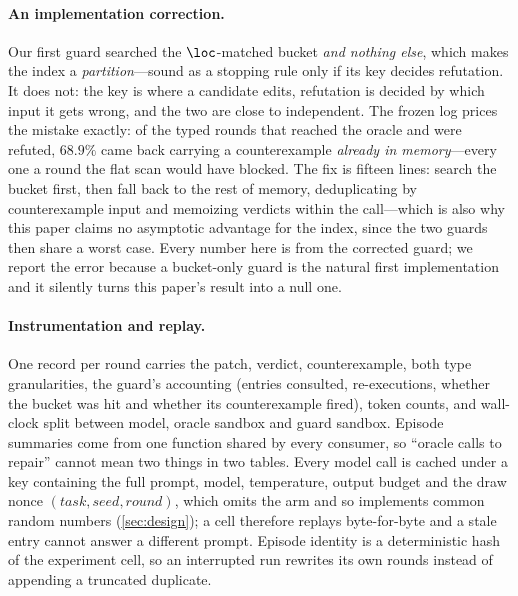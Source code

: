 \paragraph{An implementation correction.}
Our first guard searched the $\loc$-matched bucket \emph{and nothing else},
which makes the index a \emph{partition}---sound as a stopping rule only if its
key decides refutation. It does not: the key is where a candidate edits,
refutation is decided by which input it gets wrong, and the two are close to
independent. The frozen log prices the mistake exactly: of the typed rounds
that reached the oracle and were refuted, $68.9\%$ came back carrying a
counterexample \emph{already in memory}---every one a round the flat scan would
have blocked. The fix is fifteen lines: search the bucket first, then fall back
to the rest of memory, deduplicating by counterexample input and memoizing
verdicts within the call---which is also why this paper claims no asymptotic
advantage for the index, since the two guards then share a worst case. Every
number here is from the corrected guard; we report the error because a
bucket-only guard is the natural first implementation and it silently turns
this paper's result into a null one.

\paragraph{Instrumentation and replay.}
One record per round carries the patch, verdict, counterexample, both type
granularities, the guard's accounting (entries consulted, re-executions,
whether the bucket was hit and whether its counterexample fired), token counts,
and wall-clock split between model, oracle sandbox and guard sandbox. Episode
summaries come from one function shared by every consumer, so ``oracle calls to
repair'' cannot mean two things in two tables.
Every model call is cached under a key containing the full prompt, model,
temperature, output budget and the draw nonce $(\textit{task}, \textit{seed},
\textit{round})$, which omits the arm and so implements common random numbers
(\cref{sec:design}); a cell therefore replays byte-for-byte and a stale entry
cannot answer a different prompt.
Episode identity is a deterministic hash of the experiment cell, so an
interrupted run rewrites its own rounds instead of appending a truncated
duplicate.
